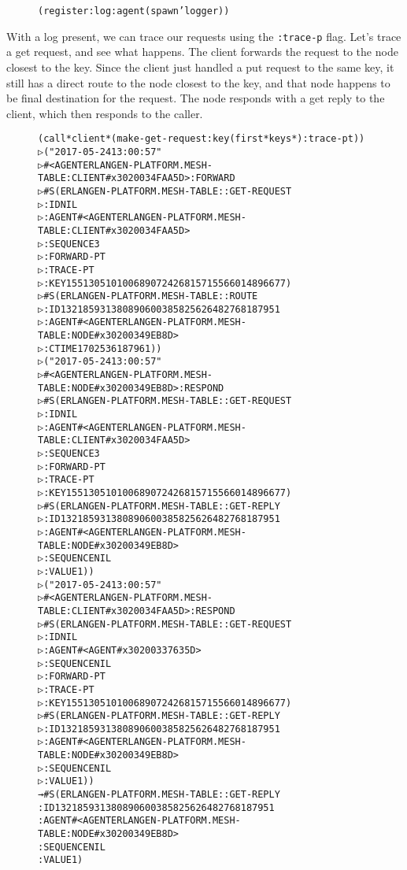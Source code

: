 \documentclass [a4paper,12pt,oneside]{article}\usepackage [paper=a4paper,left=37.5264mm,right=37.5264mm,top=37.5264mm,bottom=37.5264mm]{geometry}\usepackage {graphicx}\usepackage {tabularx}\usepackage {alltt}\usepackage {float}\usepackage [section]{placeins}\usepackage {titling}\setlength {\droptitle }{-4em}\pretitle {\begin {flushright}\bfseries \LARGE }\posttitle {\end {flushright}}\preauthor {\begin {flushright}}\postauthor {\end {flushright}}\predate {\begin {flushright}}\postdate {\end {flushright}}\usepackage [english]{babel}\usepackage [T1]{fontenc}\usepackage [utf8x]{inputenc}\usepackage {stmaryrd}\usepackage {amsfonts}\DeclareUnicodeCharacter {12314}{$\llbracket $}\DeclareUnicodeCharacter {12315}{$\rrbracket $}\DeclareUnicodeCharacter {9655}{$\rhd $}\newcommand \nobreakdash {\mbox {-}}\DeclareUnicodeCharacter {8209}{\nobreakdash }\usepackage [sc]{mathpazo}\linespread {1.05}\usepackage [font={small},labelformat=empty,labelsep=none]{caption}\tolerance=10000 \clubpenalty=10000 \widowpenalty=10000 \frenchspacing
\begin{document}
\begin {figure}[H]\centering \begin {alltt}
(register :log :agent (spawn 'logger))
\end{alltt}\vspace {-1em}\end {figure}

With a log present, we can trace our requests using the \texttt {:trace-p} flag. Let’s trace a get request, and see what happens. The client forwards the request to the node closest to the key. Since the client just handled a put request to the same key, it still has a direct route to the node closest to the key, and that node happens to be final destination for the request. The node responds with a get reply to the client, which then responds to the caller.

\begin {figure}[H]\centering \begin {alltt}
(call *client* (make-get-request :key (first *keys*) :trace-p t))
▷ ("2017-05-24 13:00:57"
▷  \#<AGENT ERLANGEN-PLATFORM.MESH-TABLE:CLIENT \#x3020034FAA5D> :FORWARD
▷  \#S(ERLANGEN-PLATFORM.MESH-TABLE::GET-REQUEST
▷     :ID NIL
▷     :AGENT \#<AGENT ERLANGEN-PLATFORM.MESH-TABLE:CLIENT \#x3020034FAA5D>
▷     :SEQUENCE 3
▷     :FORWARD-P T
▷     :TRACE-P T
▷     :KEY 155130510100689072426815715566014896677)
▷  \#S(ERLANGEN-PLATFORM.MESH-TABLE::ROUTE
▷     :ID 132185931380890600385825626482768187951
▷      :AGENT \#<AGENT ERLANGEN-PLATFORM.MESH-TABLE:NODE \#x30200349EB8D>
▷      :CTIME 1702536187961))
▷ ("2017-05-24 13:00:57"
▷  \#<AGENT ERLANGEN-PLATFORM.MESH-TABLE:NODE \#x30200349EB8D> :RESPOND
▷  \#S(ERLANGEN-PLATFORM.MESH-TABLE::GET-REQUEST
▷     :ID NIL
▷     :AGENT \#<AGENT ERLANGEN-PLATFORM.MESH-TABLE:CLIENT \#x3020034FAA5D>
▷     :SEQUENCE 3
▷     :FORWARD-P T
▷     :TRACE-P T
▷     :KEY 155130510100689072426815715566014896677)
▷  \#S(ERLANGEN-PLATFORM.MESH-TABLE::GET-REPLY
▷     :ID 132185931380890600385825626482768187951
▷     :AGENT \#<AGENT ERLANGEN-PLATFORM.MESH-TABLE:NODE \#x30200349EB8D>
▷     :SEQUENCE NIL
▷     :VALUE 1))
▷ ("2017-05-24 13:00:57"
▷  \#<AGENT ERLANGEN-PLATFORM.MESH-TABLE:CLIENT \#x3020034FAA5D> :RESPOND
▷  \#S(ERLANGEN-PLATFORM.MESH-TABLE::GET-REQUEST
▷     :ID NIL
▷     :AGENT \#<AGENT \#x30200337635D>
▷     :SEQUENCE NIL
▷     :FORWARD-P T
▷     :TRACE-P T
▷     :KEY 155130510100689072426815715566014896677)
▷  \#S(ERLANGEN-PLATFORM.MESH-TABLE::GET-REPLY
▷     :ID 132185931380890600385825626482768187951
▷     :AGENT \#<AGENT ERLANGEN-PLATFORM.MESH-TABLE:NODE \#x30200349EB8D>
▷     :SEQUENCE NIL
▷     :VALUE 1))
→ \#S(ERLANGEN-PLATFORM.MESH-TABLE::GET-REPLY
     :ID 132185931380890600385825626482768187951
     :AGENT \#<AGENT ERLANGEN-PLATFORM.MESH-TABLE:NODE \#x30200349EB8D>
     :SEQUENCE NIL
     :VALUE 1)
\end{alltt}\vspace {-1em}\end {figure}
\end{document}
